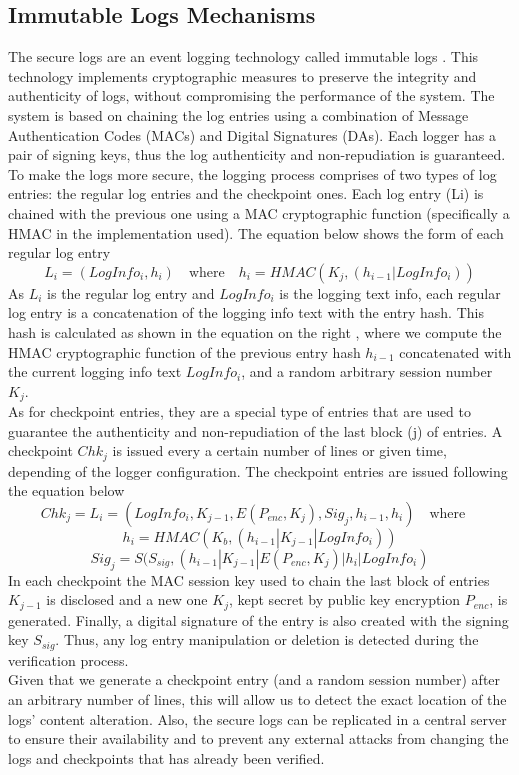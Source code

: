 \subsection{Immutable Logs Mechanisms \cite{immute}}
The secure logs are an event logging technology called immutable logs \cite{immute2}. This technology implements cryptographic measures to preserve the integrity and authenticity of logs, without compromising the performance of the system. The system is based on chaining the log entries using a combination of Message Authentication Codes (MACs) and Digital Signatures (DAs). Each logger has a pair of signing keys, thus the log authenticity and non-repudiation is guaranteed. To make the logs more secure, the logging process comprises of two types of log entries: the regular log entries and the checkpoint ones.  Each log entry (Li) is chained with the previous one using a MAC cryptographic function (specifically a HMAC \cite{hmac} in the implementation used). The equation below shows the form of each regular log entry
\begin{equation}
L_i = (LogInfo_i,h_i) \quad\text{where}\quad h_i = HMAC(K_j,(h_{i-1}|LogInfo_i))
\end{equation}
As $L_i$ is the regular log entry and $LogInfo_i$ is the logging text info, each regular log entry is a concatenation of the logging info text with the entry hash. This hash is calculated as shown in the equation on the right , where we compute the HMAC cryptographic function of the previous entry hash $h_{i-1}$ concatenated with the current logging info text $LogInfo_i$, and a random arbitrary session number $K_j$.\\
As for checkpoint entries, they are a special type of entries that are used to guarantee the authenticity and non-repudiation of the last block (j) of entries. A checkpoint $Chk_j$ is issued every a certain number of lines or given time, depending of the logger configuration. The checkpoint entries are issued following the equation below
\begin{equation}
Chk_j = L_i = (LogInfo_i,K_{j-1},E(P_{enc},K_j),Sig_j,h_{i-1},h_i)  \quad\text{where}\quad 
\end{equation}
\begin{equation*}
h_i = HMAC(K_b,(h_{i-1}|K_{j-1}|LogInfo_i))
\end{equation*}
\begin{equation*}
Sig_j = S(S_{sig},(h_{i-1}|K_{j-1}|E(P_{enc},K_j)|h_i|LogInfo_i)
\end{equation*}
In each checkpoint the MAC session key used to chain the last block  of entries $K_{j-1}$ is disclosed and a new one $K_j$, kept secret by public key encryption $P_{enc}$, is generated. Finally, a digital signature of the entry is also created with the signing key $S_{sig}$. Thus, any log entry manipulation or deletion is detected during the verification process.\\
Given that we generate a checkpoint entry (and a random session number) after an arbitrary number of lines, this will allow us to detect the exact location of the logs' content alteration. Also, the secure logs can be replicated in a central server to ensure their availability and to prevent any external attacks from changing the logs and checkpoints that has already been verified.
